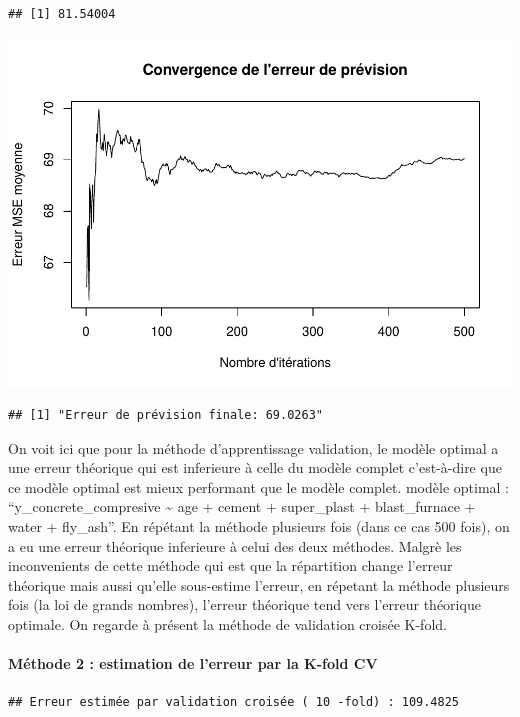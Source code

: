 \documentclass[
  12pt,
]{article}
\begin{document}
\begin{verbatim}
## [1] 81.54004
\end{verbatim}

\includegraphics{rmd_final_files/figure-latex/unnamed-chunk-50-1.pdf}

\begin{verbatim}
## [1] "Erreur de prévision finale: 69.0263"
\end{verbatim}

On voit ici que pour la méthode d'apprentissage validation, le modèle
optimal a une erreur théorique qui est inferieure à celle du modèle
complet c'est-à-dire que ce modèle optimal est mieux performant que le
modèle complet. modèle optimal : ``y\_concrete\_compresive
\textasciitilde{} age + cement + super\_plast + blast\_furnace + water +
fly\_ash''. En répétant la méthode plusieurs fois (dans ce cas 500
fois), on a eu une erreur théorique inferieure à celui des deux
méthodes. Malgrè les inconvenients de cette méthode qui est que la
répartition change l'erreur théorique mais aussi qu'elle sous-estime
l'erreur, en répetant la méthode plusieurs fois (la loi de grands
nombres), l'erreur théorique tend vers l'erreur théorique optimale. On
regarde à présent la méthode de validation croisée K-fold.

\paragraph{Méthode 2 : estimation de l'erreur par la K-fold
CV}\label{muxe9thode-2-estimation-de-lerreur-par-la-k-fold-cv}

\begin{verbatim}
## Erreur estimée par validation croisée ( 10 -fold) : 109.4825
\end{verbatim}
\end{document}
